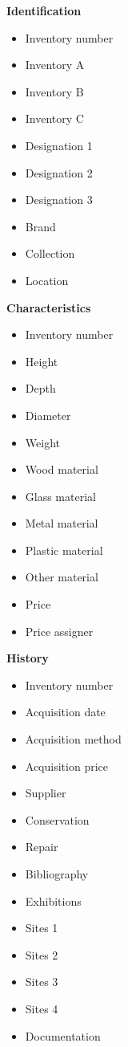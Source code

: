 \vspace{4mm}
\textbf{Identification}
\begin{multicols}{2}
\begin{itemize}
    \item Inventory number
    \item Inventory A
    \item Inventory B
    \item Inventory C
    \item Designation 1
    \item Designation 2
    \item Designation 3
    \item Brand
    \item Collection
    \item Location
\end{itemize}
\end{multicols}
\vspace{4mm}
\textbf{Characteristics}
\begin{multicols}{2}
\begin{itemize}
    \item Inventory number
    \item Height
    \item Depth
    \item Diameter
    \item Weight
    \item Wood material
    \item Glass material
    \item Metal material
    \item Plastic material
    \item Other material
    \item Price
    \item Price assigner
\end{itemize}
\end{multicols}


\textbf{History}
\begin{multicols}{2}
\begin{itemize}
    \item Inventory number
    \item Acquisition date
    \item Acquisition method
    \item Acquisition price
    \item Supplier
    \item Conservation
    \item Repair
    \item Bibliography
    \item Exhibitions
    \item Sites 1
    \item Sites 2
    \item Sites 3
    \item Sites 4
    \item Documentation
\end{itemize}
\end{multicols}

